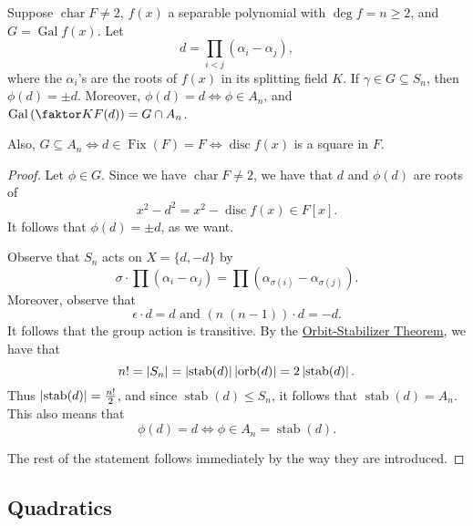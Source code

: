 \documentclass[notoc,notitlepage,nobib]{tufte-book}
\DeclareMathOperator{\disc}{disc}
\DeclareMathOperator{\Gal}{Gal}
\DeclareMathOperator{\Fix}{Fix}
\DeclareMathOperator{\stab}{stab}
\DeclareMathOperator{\orb}{orb}
\DeclareMathOperator{\Char}{char}
\begin{document}
\begin{propo}\label{propo:galois_group_of_finite_extensions}
  Suppose $\Char F \neq 2$, $f(x)$ a separable polynomial with $\deg f = n \geq
  2$, and $G = \Gal f(x)$. Let 
  \begin{equation*}
    d = \prod_{i < j} (\alpha_i - \alpha_j),
  \end{equation*}
  where the $\alpha_i$'s are the roots of $f(x)$ in its splitting field $K$. If
  $\gamma \in G \subseteq S_n$, then $\phi(d) = \pm d$. Moreover, $\phi(d) = d
  \iff \phi \in A_n$, and $\Gal \left( \quotient{K}{F(d)} \right) = G \cap A_n$.

  Also, $G \subseteq A_n \iff d \in \Fix(F) = F \iff \disc f(x)$ is a square in
  $F$.
\end{propo}

\begin{proof}
  Let $\phi \in G$. Since we have $\Char F \neq 2$, we have that $d$ and
  $\phi(d)$ are roots of
  \begin{equation*}
    x^2 - d^2 = x^2 - \disc f(x) \in F[x].
  \end{equation*}
  It follows that $\phi(d) = \pm d$, as we want.

  Observe that $S_n$ acts on $X = \{d, -d\}$ by
  \begin{equation*}
    \sigma \cdot \prod (\alpha_i - \alpha_j) = \prod (\alpha_{\sigma(i)} -
    \alpha_{\sigma(j)}).
  \end{equation*}
  Moreover, observe that
  \begin{equation*}
    \epsilon \cdot d = d \text{ and } (n \; (n - 1)) \cdot d = -d.
  \end{equation*}
  It follows that the group action is transitive. By the
  \hyperref[thm:orbit_stabilizer_theorem]{Orbit-Stabilizer Theorem}, we have
  that
  \begin{equation*}
    n! = \abs{S_n} = \abs{\stab(d)} \abs{\orb(d)} = 2 \abs{\stab(d)}.
  \end{equation*}
  Thus $\abs{\stab(d)} = \frac{n!}{2}$, and since $\stab(d) \leq S_n$, it
  follows that $\stab(d) = A_n$. This also means that
  \begin{equation*}
    \phi(d) = d \iff \phi \in A_n = \stab(d).
  \end{equation*}

  The rest of the statement follows immediately by the way they are introduced.
\end{proof}

\subsection{Quadratics}%
\label{sub:quadratics}
\end{document}
